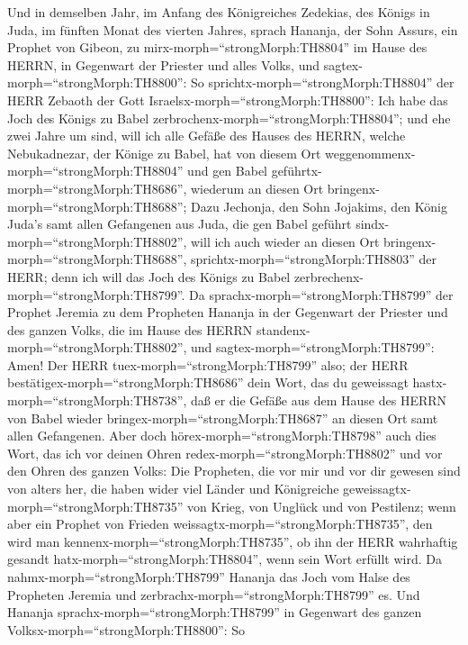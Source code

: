  Und in demselben Jahr, im Anfang des Königreiches Zedekias,
des Königs in Juda, im fünften Monat des vierten Jahres, sprach Hananja,
der Sohn Assurs, ein Prophet von Gibeon, zu
mirx-morph=``strongMorph:TH8804'' im Hause des HERRN, in Gegenwart der
Priester und alles Volks, und sagtex-morph=``strongMorph:TH8800'':
 So sprichtx-morph=``strongMorph:TH8804'' der HERR Zebaoth
der Gott Israelsx-morph=``strongMorph:TH8800'': Ich habe das Joch des
Königs zu Babel zerbrochenx-morph=``strongMorph:TH8804''; 
und ehe zwei Jahre um sind, will ich alle Gefäße des Hauses des HERRN,
welche Nebukadnezar, der Könige zu Babel, hat von diesem Ort
weggenommenx-morph=``strongMorph:TH8804'' und gen Babel
geführtx-morph=``strongMorph:TH8686'', wiederum an diesen Ort
bringenx-morph=``strongMorph:TH8688'';  Dazu Jechonja, den
Sohn Jojakims, den König Juda's samt allen Gefangenen aus Juda, die gen
Babel geführt sindx-morph=``strongMorph:TH8802'', will ich auch wieder
an diesen Ort bringenx-morph=``strongMorph:TH8688'',
sprichtx-morph=``strongMorph:TH8803'' der HERR; denn ich will das Joch
des Königs zu Babel zerbrechenx-morph=``strongMorph:TH8799''.
 Da sprachx-morph=``strongMorph:TH8799'' der Prophet Jeremia
zu dem Propheten Hananja in der Gegenwart der Priester und des ganzen
Volks, die im Hause des HERRN standenx-morph=``strongMorph:TH8802'',
 und sagtex-morph=``strongMorph:TH8799'': Amen! Der HERR
tuex-morph=``strongMorph:TH8799'' also; der HERR
bestätigex-morph=``strongMorph:TH8686'' dein Wort, das du geweissagt
hastx-morph=``strongMorph:TH8738'', daß er die Gefäße aus dem Hause des
HERRN von Babel wieder bringex-morph=``strongMorph:TH8687'' an diesen
Ort samt allen Gefangenen.  Aber doch
hörex-morph=``strongMorph:TH8798'' auch dies Wort, das ich vor deinen
Ohren redex-morph=``strongMorph:TH8802'' und vor den Ohren des ganzen
Volks:  Die Propheten, die vor mir und vor dir gewesen sind
von alters her, die haben wider viel Länder und Königreiche
geweissagtx-morph=``strongMorph:TH8735'' von Krieg, von Unglück und von
Pestilenz;  wenn aber ein Prophet von Frieden
weissagtx-morph=``strongMorph:TH8735'', den wird man
kennenx-morph=``strongMorph:TH8735'', ob ihn der HERR wahrhaftig gesandt
hatx-morph=``strongMorph:TH8804'', wenn sein Wort erfüllt wird.
 Da nahmx-morph=``strongMorph:TH8799'' Hananja das Joch vom
Halse des Propheten Jeremia und zerbrachx-morph=``strongMorph:TH8799''
es.  Und Hananja sprachx-morph=``strongMorph:TH8799'' in
Gegenwart des ganzen Volksx-morph=``strongMorph:TH8800'': So
